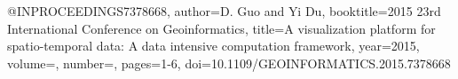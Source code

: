 @INPROCEEDINGS{7378668,
  author={D. {Guo} and  {Yi Du}},
  booktitle={2015 23rd International Conference on Geoinformatics}, 
  title={A visualization platform for spatio-temporal data: A data intensive computation framework}, 
  year={2015},
  volume={},
  number={},
  pages={1-6},
  doi={10.1109/GEOINFORMATICS.2015.7378668}}